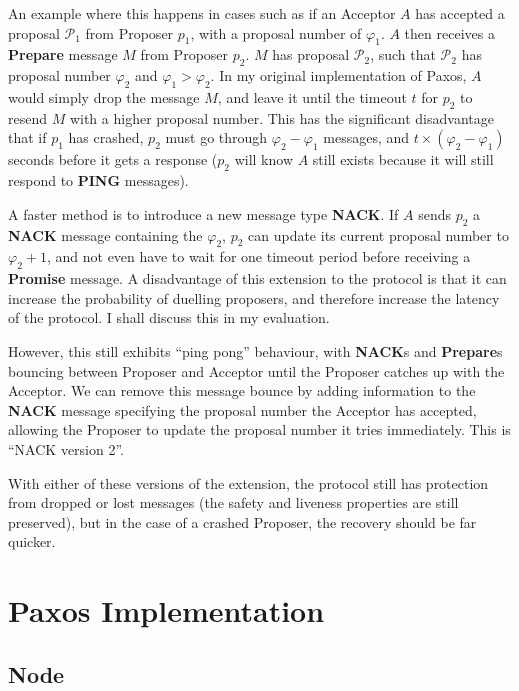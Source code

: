 \documentclass[12pt,twoside,notitlepage]{report}
\newcommand{\msg}[1] {{\bf #1}}         %
\begin{document}
An example where this happens in cases such as if an Acceptor $A$ has accepted a proposal
$\mathcal{P}_1$ from Proposer $p_1$, with a proposal number of $\varphi_1$. $A$ then receives a
\msg{Prepare} message $M$ from Proposer $p_2$. $M$ has proposal $\mathcal{P}_2$, such that
$\mathcal{P}_2$ has proposal number $\varphi_2$ and $\varphi_1 > \varphi_2$. In my original
implementation of Paxos, $A$ would simply drop the message $M$, and leave it until the timeout $t$
for $p_2$ to resend $M$ with a higher proposal number. This has the significant disadvantage that
if $p_1$ has crashed, $p_2$ must go through $\varphi_2 - \varphi_1$ messages, and $t\times
(\varphi_2 - \varphi_1)$ seconds before it gets a response ($p_2$ will know $A$ still exists
because it will still respond to \msg{PING} messages).


A faster method is to introduce a new message type \msg{NACK}. If $A$ sends $p_2$ a \msg{NACK}
message containing the $\varphi_2$, $p_2$ can update its current proposal number to $\varphi_2 +
1$, and not even have to wait for one timeout period before receiving a \msg{Promise} message. A
disadvantage of this extension to the protocol is that it can increase the probability of duelling
proposers, and therefore increase the latency of the protocol. I shall discuss this in my
evaluation.

However, this still exhibits ``ping pong'' behaviour, with \msg{NACK}s and \msg{Prepare}s bouncing
between Proposer and Acceptor until the Proposer catches up with the Acceptor. We can remove this
message bounce by adding information to the \msg{NACK} message specifying the proposal number the
Acceptor has accepted, allowing the Proposer to update the proposal number it tries immediately.
This is ``NACK version 2''.


With either of these versions of the extension, the protocol still has protection from dropped or
lost messages (the safety and liveness properties are still preserved), but in the case of a
crashed Proposer, the recovery should be far quicker.

\section{Paxos Implementation}

\subsection{Node}
\end{document}
